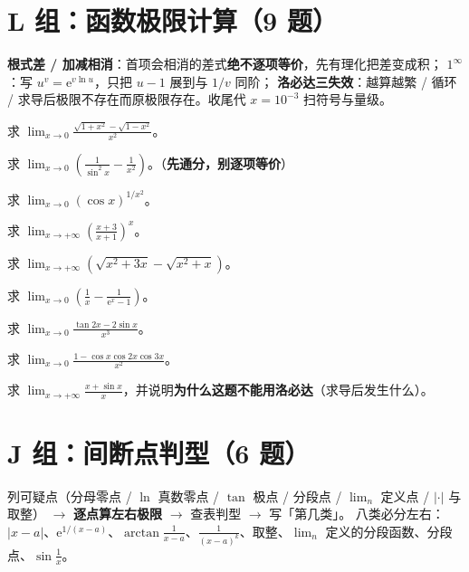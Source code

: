 \documentclass[11pt,a4paper]{ctexart}
\newcommand{\abs}[1]{\left\lvert #1\right\rvert}
\newcommand{\ee}{\mathrm{e}}
\begin{document}
\section{L 组：函数极限计算（9 题）}

\begin{methodbox}[三句口令]
\textbf{根式差 / 加减相消}：首项会相消的差式\textbf{绝不逐项等价}，先有理化把差变成积；
\textbf{$1^\infty$}：写 $u^v=\ee^{v\ln u}$，只把 $u-1$ 展到与 $1/v$ 同阶；
\textbf{洛必达三失效}：越算越繁 / 循环 / 求导后极限不存在而原极限存在。收尾代 $x=10^{-3}$ 扫符号与量级。
\end{methodbox}

\begin{qlist}
\item 求 $\displaystyle\lim_{x\to0}\frac{\sqrt{1+x^2}-\sqrt{1-x^2}}{x^2}$。
\item 求 $\displaystyle\lim_{x\to0}\left(\frac1{\sin^2x}-\frac1{x^2}\right)$。（\textbf{先通分，别逐项等价}）
\item 求 $\displaystyle\lim_{x\to0}(\cos x)^{1/x^2}$。
\item 求 $\displaystyle\lim_{x\to+\infty}\left(\frac{x+3}{x+1}\right)^{x}$。
\item 求 $\displaystyle\lim_{x\to+\infty}\left(\sqrt{x^2+3x}-\sqrt{x^2+x}\right)$。
\item 求 $\displaystyle\lim_{x\to0}\left(\frac1x-\frac1{\ee^x-1}\right)$。
\item 求 $\displaystyle\lim_{x\to0}\frac{\tan 2x-2\sin x}{x^3}$。
\item 求 $\displaystyle\lim_{x\to0}\frac{1-\cos x\cos 2x\cos 3x}{x^2}$。
\item 求 $\displaystyle\lim_{x\to+\infty}\frac{x+\sin x}{x}$，并说明\textbf{为什么这题不能用洛必达}（求导后发生什么）。
\end{qlist}

\section{J 组：间断点判型（6 题）}

\begin{methodbox}[四步]
列可疑点（分母零点 / $\ln$ 真数零点 / $\tan$ 极点 / 分段点 / $\lim_n$ 定义点 / $\abs{\cdot}$ 与取整）
$\to$ \textbf{逐点算左右极限} $\to$ 查表判型 $\to$ 写「第几类」。
八类必分左右：$\abs{x-a}$、$\ee^{1/(x-a)}$、$\arctan\frac1{x-a}$、$\frac1{(x-a)^k}$、取整、$\lim_n$ 定义的分段函数、分段点、$\sin\frac1x$。
\end{methodbox}
\end{document}
